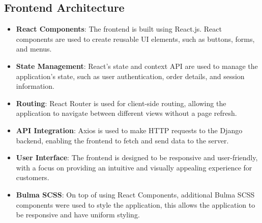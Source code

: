 \subsection{Frontend Architecture}
\begin{itemize}
    \item \textbf{React Components}: The frontend is built using React.js. React components are used to create reusable UI elements, such as buttons, forms, and menus.
    \item \textbf{State Management}: React's state and context API are used to manage the application's state, such as user authentication, order details, and session information.
    \item \textbf{Routing}: React Router is used for client-side routing, allowing the application to navigate between different views without a page refresh.
    \item \textbf{API Integration}: Axios is used to make HTTP requests to the Django backend, enabling the frontend to fetch and send data to the server.
    \item \textbf{User Interface}: The frontend is designed to be responsive and user-friendly, with a focus on providing an intuitive and visually appealing experience for customers.
    \item \textbf{Bulma SCSS}: On top of using React Components, additional Bulma SCSS components were used to style the application, this allows the application to be responsive and have uniform styling.
\end{itemize}

